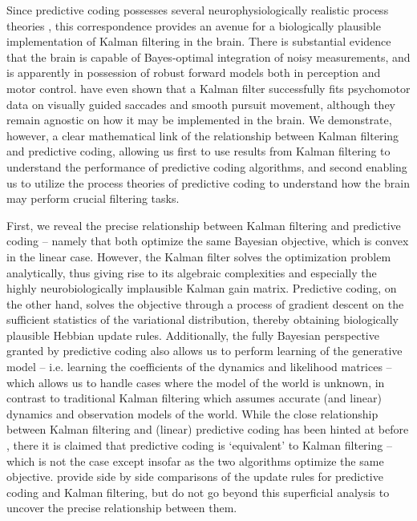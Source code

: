 Since predictive coding possesses several neurophysiologically realistic process theories \citep{bastos2012canonical}, this correspondence provides an avenue for a biologically plausible implementation of Kalman filtering in the brain. There is substantial evidence that the brain is capable of Bayes-optimal integration of noisy measurements, and is apparently in possession of robust forward models both in perception \citep*{zago2008internal,simoncelli2009optimal} and motor control\citep*{munuera2009optimal, gold2003influence,todorov2004optimality}. \citet*{de2013kalman} have even shown that a Kalman filter successfully fits psychomotor data on visually guided saccades and smooth pursuit movement, although they remain agnostic on how it may be implemented in the brain. We demonstrate, however, a clear mathematical link of the relationship between Kalman filtering and predictive coding, allowing us first to use results from Kalman filtering to understand the performance of predictive coding algorithms, and second enabling us to utilize the process theories of predictive coding to understand how the brain may perform crucial filtering tasks.

First, we reveal the precise relationship between Kalman filtering and predictive coding -- namely that both optimize the same Bayesian objective, which is convex in the linear case. However, the Kalman filter solves the optimization problem analytically, thus giving rise to its algebraic complexities and especially the highly neurobiologically implausible Kalman gain matrix. Predictive coding, on the other hand, solves the objective through a process of gradient descent on the sufficient statistics of the variational distribution, thereby obtaining biologically plausible Hebbian update rules. Additionally, the fully Bayesian perspective granted by predictive coding also allows us to perform learning of the generative model -- i.e. learning the coefficients of the dynamics and likelihood matrices -- which allows us to handle cases where the model of the world is unknown, in contrast to traditional Kalman filtering which assumes accurate (and linear) dynamics and observation models of the world. While the close relationship between Kalman filtering and (linear) predictive coding has been hinted at before \citep{friston2005theory,friston2008hierarchical}, there it is claimed that predictive coding is `equivalent' to Kalman filtering -- which is not the case except insofar as the two algorithms optimize the same objective. \citet{baltieri2020kalman} provide side by side comparisons of the update rules for predictive coding and Kalman filtering, but do not go beyond this superficial analysis to uncover the precise relationship between them. 

